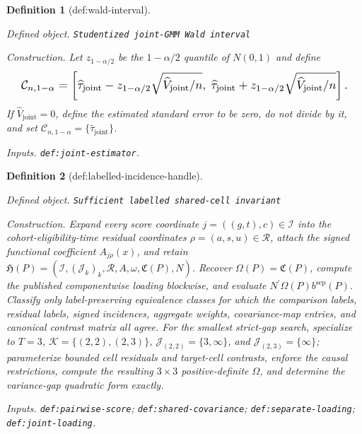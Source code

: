 \documentclass{article}
\newtheorem{definition}{Definition}
\begin{document}
\begin{definition}[def:wald-interval]\label{def:wald-interval}
\par\smallskip\noindent\emph{Defined object.} \texttt{Studentized joint-\allowbreak{}GMM Wald interval}
\par\smallskip\noindent\emph{Construction.} Let \(z_{1-\alpha/2}\) be the \(1-\alpha/2\) quantile of \(N(0,1)\) and define \[
\makebox[\linewidth][c]{\resizebox{0.98\linewidth}{!}{\leavevmode\par\noindent \makebox[\linewidth][c]{\resizebox{0.98\linewidth}{!}{\(\displaystyle \displaystyle \mathcal C_{n,1-\alpha}=\left[\widehat\tau_{\mathrm{joint}}-z_{1-\alpha/2}\sqrt{\widehat V_{\mathrm{joint}}/n},\;\widehat\tau_{\mathrm{joint}}+z_{1-\alpha/2}\sqrt{\widehat V_{\mathrm{joint}}/n}\right].\)}}\par\noindent}}
\] If \(\widehat V_{\mathrm{joint}}=0\), define the estimated standard error to be zero, do not divide by it, and set \(\mathcal C_{n,1-\alpha}=\{\widehat\tau_{\mathrm{joint}}\}\).
\par\smallskip\noindent\emph{Inputs.} \texttt{def:\allowbreak{}joint-\allowbreak{}estimator}.
\end{definition}

\begin{definition}[def:labelled-incidence-handle]\label{def:labelled-incidence-handle}
\par\smallskip\noindent\emph{Defined object.} \texttt{Sufficient labelled shared-\allowbreak{}cell invariant}
\par\smallskip\noindent\emph{Construction.} Expand every score coordinate \(j=((g,t),c)\in\mathcal I\) into the cohort-eligibility-time residual coordinates \(\rho=(a,s,u)\in\mathcal R\), attach the signed functional coefficient \(A_{j\rho}(x)\), and retain \(\mathfrak H(P)=(\mathcal I,(\mathcal J_k)_k,\mathcal R,A,\omega,\mathfrak C(P),N)\). Recover \(\Omega(P)=\mathfrak C(P)\), compute the published componentwise loading blockwise, and evaluate \(N^{\prime}\Omega(P)b^{\mathrm{sep}}(P)\). Classify only label-preserving equivalence classes for which the comparison labels, residual labels, signed incidences, aggregate weights, covariance-map entries, and canonical contrast matrix all agree. For the smallest strict-gap search, specialize to \(T=3\), \(\mathcal K=\{(2,2),(2,3)\}\), \(\mathcal J_{(2,2)}=\{3,\infty\}\), and \(\mathcal J_{(2,3)}=\{\infty\}\); parameterize bounded cell residuals and target-cell contrasts, enforce the causal restrictions, compute the resulting \(3\times3\) positive-definite \(\Omega\), and determine the variance-gap quadratic form exactly.
\par\smallskip\noindent\emph{Inputs.} \texttt{def:\allowbreak{}pairwise-\allowbreak{}score}; \texttt{def:\allowbreak{}shared-\allowbreak{}covariance}; \texttt{def:\allowbreak{}separate-\allowbreak{}loading}; \texttt{def:\allowbreak{}joint-\allowbreak{}loading}.
\end{definition}
\end{document}
